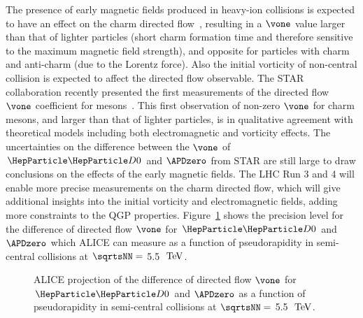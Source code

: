 The presence of early magnetic fields produced in heavy-ion collisions is expected to have an effect on the charm directed flow~\cite{Das:2016cwd,Chatterjee:2018lsx,Plumari,Sandeep}, resulting in a $\vone$ value larger than that of lighter particles (short charm formation time and therefore sensitive to the maximum magnetic field strength), and opposite for particles with charm and anti-charm (due to the Lorentz force). Also the initial vorticity of non-central collision is expected to affect the directed flow observable.
The STAR collaboration recently presented the first measurements of the directed flow $\vone$ coefficient for mesons~\cite{Singha}. This first observation of non-zero $\vone$ for charm mesons, and larger than that of lighter particles, is in qualitative agreement with theoretical models including both electromagnetic and vorticity effects. The uncertainties on the difference between the $\vone$ of $\PDz$ and $\APDzero$
from STAR are still large to draw conclusions on the effects of the early magnetic fields.
The LHC Run 3 and 4 will enable more precise measurements on the charm directed flow, which will give additional insights into the initial vorticity and electromagnetic fields, adding more constraints to the QGP properties. Figure~\ref{fig:v1} shows the precision level for the difference of directed flow $\vone$ for $\PDz$ and $\APDzero$ which ALICE can measure as a function of pseudorapidity in semi-central \PbPb collisions at $\sqrtsNN=$ 5.5 $~\text{TeV}$.

\begin{figure}
\centering
{}
\caption{ALICE projection of the difference of directed flow $\vone$ for $\PDz$ and $\APDzero$ as a function of pseudorapidity in semi-central \PbPb collisions at $\sqrtsNN=$ 5.5 $~\text{TeV}$.}
\label{fig:v1}
\end {figure}





